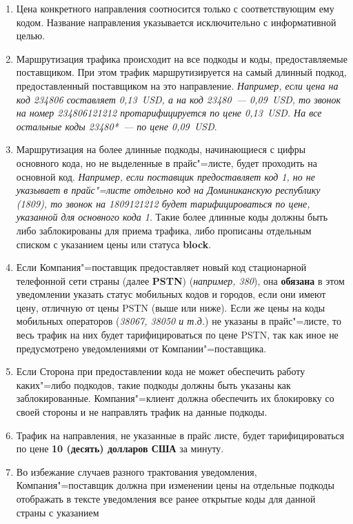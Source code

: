 \begin{Form}
\begin{enumerate}[label=\thesection.\arabic*.]
  \item \label{enu:2.2-ru}Цена конкретного направления соотносится только с соответствующим
    ему кодом. Название направления указывается исключительно с информативной
    целью.
  \item Маршрутизация трафика происходит на все подкоды и коды, предоставляемые
    поставщиком. При этом трафик маршрутизируется на самый длинный подкод,
    предоставленный поставщиком на это направление. \textit{Например, если цена
    на код 234806 составляет 0,13~USD, а на код 23480~---
    0,09~USD, то звонок на номер 234806121212 протарифицируется
    по цене 0,13~USD. На все остальные коды 23480{*}~--- по цене
    0,09~USD}.
  \item Маршрутизация на более длинные подкоды, начинающиеся с цифры основного
    кода, но не выделенные в прайс"=листе, будет проходить на основной
    код. \textit{Например, если поставщик предоставляет код 1, но не
    указывает в прайс"=листе отдельно код на Доминиканскую республику (1809),
    то звонок на 1809121212 будет тарифицироваться по цене, указанной
    для основного кода 1}. Такие более длинные коды должны быть
    либо заблокированы для приема трафика, либо прописаны отдельным списком
    с указанием цены или статуса \textbf{\flqq{}block\frqq{}}.
  \item Если Компания"=поставщик предоставляет новый код стационарной телефонной
    сети страны (далее \textbf{ \flqq{}PSTN\frqq{}}) (\textit{например, 380}),
    она \textbf{обязана} в этом уведомлении указать статус мобильных кодов и городов,
    если они имеют цену, отличную от цены PSTN (выше или ниже). Если же
    цены на коды мобильных операторов (\textit{38067, 38050
    и т.д.}) не указаны в прайс"=листе, то весь трафик на них будет тарифицироваться
    по цене PSTN, так как иное не предусмотрено уведомлениями от Компании"=поставщика.
  \item Если Сторона при предоставлении кода не может обеспечить работу каких"=либо
    подкодов, такие подкоды должны быть указаны как заблокированные. Компания"=клиент
    должна обеспечить их блокировку со своей стороны и не направлять трафик
    на данные подкоды.
  \item Трафик на направления, не указанные в прайс листе, будет тарифицироваться
    по цене \textbf{10 (десять) долларов США} за минуту.
  \item Во избежание случаев разного трактования уведомления, Компания"=поставщик
    должна при изменении цены на отдельные подкоды отображать в тексте
    уведомления все ранее открытые коды для данной страны с указанием

\end{enumerate}
\end{Form}
